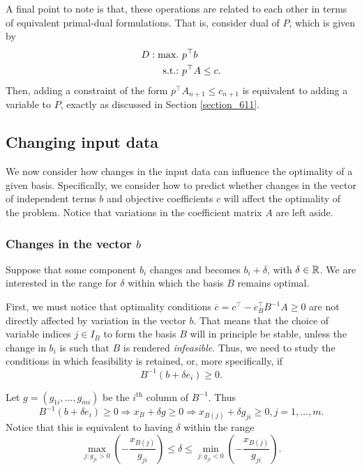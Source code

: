 A final point to note is that, these operations are related to each other in terms of equivalent primal-dual formulations. That is, consider dual of $P$, which is given by
%
\begin{align*}
	D : \mathop{\text{max.~}}   & p^\top b \\
	\mathop{\text{s.t.:~}} 			& p^\top A \le c.
\end{align*}
%
Then, adding a constraint of the form $p^\top A_{n+1} \leq c_{n+1}$ is equivalent to adding a variable to $P$, exactly as discussed in Section \ref{section_611}.


\subsection{Changing input data}

We now consider how changes in the input data can influence the optimality of a given basis. Specifically, we consider how to predict whether changes in the vector of independent terms $b$ and objective coefficients $c$ will affect the optimality of the problem. Notice that variations in the coefficient matrix $A$ are left aside.


\subsubsection{Changes in the vector $b$}

Suppose that some component $b_i$ changes and becomes $b_i + \delta$, with $\delta \in \mathbb{R}$. We are interested in the range for $\delta$ within which the basis $B$ remains optimal.

First, we must notice that optimality conditions $\overline{c} = c^\top - c^\top_B B^{-1}A \geq 0$ are not directly affected by variation in the vector $b$. That means that the choice of variable indices $j \in I_B$ to form the basis $B$ will in principle be stable, unless the change in $b_i$ is such that $B$ is rendered \emph{infeasible}. Thus, we need to study the conditions in which  feasibility is retained, or, more specifically, if 
%
\begin{equation*}
	B^{-1}(b + \delta e_i) \geq 0.	
\end{equation*}

Let $g = (g_{1i}, \dots, g_{mi})$ be the $i^\text{th}$ column of $B^{-1}$. Thus
%
\begin{equation*}
	B^{-1}(b + \delta e_i) \geq 0 \Rightarrow x_B + \delta g \geq 0 \Rightarrow x_{B(j)} + \delta g_{ji} \geq 0, j = 1,\dots, m.  
\end{equation*}
%
Notice that this is equivalent to having $\delta$ within the range
%
\begin{equation*}
	\max_{j : g_{ji} > 0}\left(-\frac{x_{B(j)}}{g_{ji}}\right) \leq \delta \leq \min_{j : g_{ji} < 0}\left(-\frac{x_{B(j)}}{g_{ji}}\right).	
\end{equation*}

